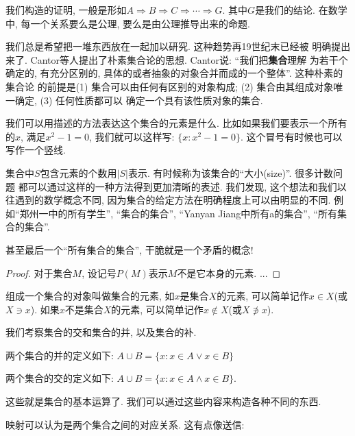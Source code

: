 我们构造的证明, 一般是形如$A\Rightarrow B\Rightarrow C \Rightarrow \cdots \Rightarrow G$.
其中$G$是我们的结论. 在数学中, 每一个关系要么是公理, 要么是由公理推导出来的命题. 

 我们总是希望把一堆东西放在一起加以研究. 这种趋势再19世纪末已经被
明确提出来了. Cantor等人提出了朴素集合论的思想. Cantor说: ``我们把\textbf{集合}理解
为若干个确定的, 有充分区别的, 具体的或者抽象的对象合并而成的一个整体''. 这种朴素的集合论
的前提是(1) 集合可以由任何有区别的对象构成; (2) 集合由其组成对象唯一确定, (3) 任何性质都可以
确定一个具有该性质对象的集合. 

我们可以用描述的方法表达这个集合的元素是什么. 比如如果我们要表示一个所有的$x$, 满足$x^2-1=0$,
我们就可以这样写: $\{x: x^2-1=0\}.$ 这个冒号有时候也可以写作一个竖线.

集合中$S$包含元素的个数用$|S|$表示. 有时候称为该集合的``大小(size)''. 很多计数问题
都可以通过这样的一种方法得到更加清晰的表述. 
我们发现, 这个想法和我们以往遇到的数学概念不同, 因为集合的给定方法在明确程度上可以由明显的不同. 
例如``郑州一中的所有学生'', ``集合的集合'', ``Yanyan Jiang中所有a的集合'', ``所有集合的集合''.

甚至最后一个``所有集合的集合'', 干脆就是一个矛盾的概念! 

\begin{proof}
    对于集合$M$, 设记号$P(M)$表示$M$不是它本身的元素. ...
\end{proof}

组成一个集合的对象叫做集合的元素, 如$x$是集合$X$的元素, 可以简单记作$x\in X$(或$X\ni x$). 
如果$x$不是集合$X$的元素, 可以简单记作$x\not \in X$(或$X\not\ni x$). 

 我们考察集合的交和集合的并, 以及集合的补. 

\begin{definition}
  两个集合的并的定义如下: $A\cup B=\{x:x\in A \lor x\in B\}$
\end{definition}

\begin{definition}
两个集合的交的定义如下: $A\cup B=\{x:x\in A \land x\in B\}$.
\end{definition}

这些就是集合的基本运算了. 我们可以通过这些内容来构造各种不同的东西. 


映射可以认为是两个集合之间的对应关系. 这有点像送信: 

